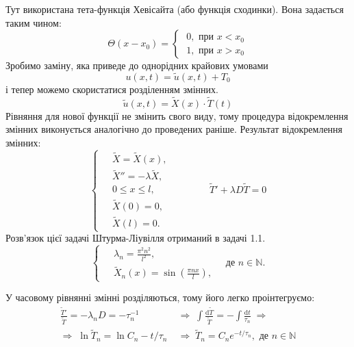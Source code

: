 Тут використана тета-функція Хевісайта (або функція сходинки). Вона задається таким чином:
\begin{equation*}
    \Theta(x - x_0) = 
    \begin{cases}
        \;0, \text{ при } x < x_0\\
        \;1, \text{ при } x > x_0
    \end{cases}    
\end{equation*}
Зробимо заміну, яка приведе до однорідних крайових умовами\[u(x,t) = \widetilde{u}(x,t) + T_0 \] і тепер можемо скористатися розділенням змінних.
\begin{equation}
    \widetilde{u}(x,t) = \widetilde{X}(x)\cdot\widetilde{T}(t) 
\end{equation}
Рівняння для нової функції не змінить свого виду, тому процедура відокремлення змінних виконується аналогічно до проведених раніше. Результат відокремлення змінних:
\begin{equation} 
    \left\{ \begin{aligned}
        \;&\widetilde{X} = \widetilde{X}(x), \\  &\widetilde{X}'' = -\lambda \widetilde{X}, \\ &0 \leq x \leq l, \\  &\widetilde{X}(0) = 0, \\ &\widetilde{X}(l) = 0. 
    \end{aligned} \right.
    \qquad\qquad
    \widetilde{T}' + \lambda D \widetilde{T} = 0
\end{equation}
Розв'язок цієї задачі Штурма-Ліувілля отриманий в задачі 1.1. %
\begin{equation} 
    \left\{ \begin{aligned}
        \;&\lambda_n = \frac{\pi^2 n^2}{l^2},\\ 
        &\widetilde{X}_n(x) = \sin\left(\frac{\pi n x}{l}\right),
    \end{aligned} \right.
    \quad \text{де } n \in \mathbb{N}.
\end{equation}

У часовому рівнянні змінні розділяються, тому його легко проінтегруємо:
\begin{equation}
    \begin{aligned}
        \frac{\widetilde{T}'}{\widetilde{T}} = -\lambda_n D = -\tau_n^{-1}
        \;&\Rightarrow\;
        \int \frac{\mathrm{d} \widetilde{T}}{\widetilde{T}} = - \int \frac{\mathrm{d} t}{\tau_n}
        \;\Rightarrow\\
        \Rightarrow\;
        \ln{\widetilde{T}_n} = \ln{C_n} - t/\tau_n
        \;&\Rightarrow\;
        \widetilde{T}_n = C_n e^{-t/\tau_n}, \text{ де } n \in \mathbb{N}
    \end{aligned}
\end{equation}

